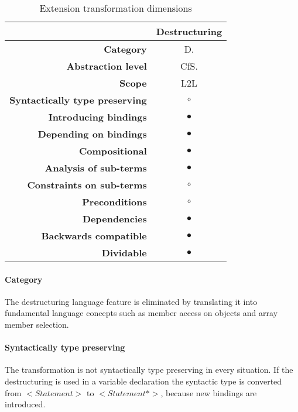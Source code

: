 \begin{table}[h]
\centering
\caption{Extension transformation dimensions}
\label{destructuring-table}
\begin{tabular}{@{}rc@{}}
\toprule
                                       & \multicolumn{1}{l}{\textbf{Destructuring}} \\ \midrule
\textbf{Category}                      & D.
\\
\textbf{Abstraction level}          & CfS.                          \\
\textbf{Scope}                         & L2L                               \\
\textbf{Syntactically type preserving} & $\circ$                                          \\
\textbf{Introducing bindings}          & $\bullet$                                          \\%
\textbf{Depending on bindings}         & $\bullet$                                           \\
\textbf{Compositional}                 & $\bullet$                                          \\
\textbf{Analysis of sub-terms}          & $\bullet$                                          \\
\textbf{Constraints on sub-terms}       & $\circ$                                           \\
\textbf{Preconditions}                 & $\circ$                                          \\
\textbf{Dependencies}                  & $\bullet$                                           \\
\textbf{Backwards compatible}          & $\bullet$                                          \\
\textbf{Dividable}                     & $\bullet$                                           \\ \bottomrule
\end{tabular}
\end{table}

\paragraph{Category}
The destructuring language feature is eliminated by translating it into fundamental language concepts such as member access on objects and array member selection.

\paragraph{Syntactically type preserving}
The transformation is not syntactically type preserving in every situation. If the destructuring is used in a variable declaration the syntactic type is converted from $<Statement>$ to $<Statement*>$, because new bindings are introduced.

